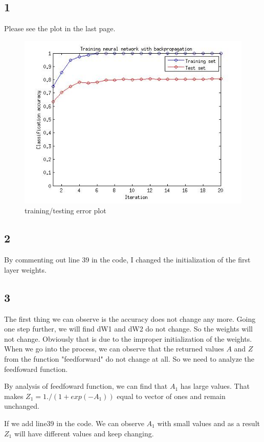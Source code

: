 \documentclass[paper=a4, fontsize=15pt]{article} %
\begin{document}
\subsection*{1}
Please see the plot in the last page.
\begin{figure}[hb]
\includegraphics[width=\linewidth]{./a3_datacode/normal.jpg}
\caption{training/testing error plot}
\label{fig:normal}
\end{figure}

\subsection*{2}
By commenting out line 39 in the code, I changed the initialization of the first layer weights.
\subsection*{3}
The first thing we can observe is the accuracy does not change any more.
Going one step further, we will find dW1 and dW2 do not change.
So the weights will not change. Obviously that is due to the improper initialization of the weights.
When we go into the process, we can observe that the returned values $A$ and $Z$ from the function "feedforward" do not change at all. So we need to analyze the feedfoward function.

By analysis of feedfoward function, we can find that $A_{1}$ has large values. That makes $Z_{1} =1./(1+exp(-A_{1}))$ equal to vector of ones and remain unchanged. 

If we add line39 in the code. We can observe $A_{1}$ with small values and as a result $Z_{1}$ will have different values and keep changing.




\end{document}
